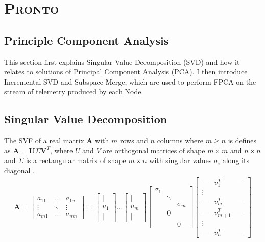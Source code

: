 \section{\protect\textsc{Pronto}}

\subsection{Principle Component Analysis}
This section first explains Singular Value Decomposition (SVD) and how it
relates to solutions of Principal Component Analysis (PCA). I then introduce
Incremental-SVD and Subspace-Merge, which are used to perform FPCA on the stream
of telemetry produced by each Node.

\subsection{Singular Value Decomposition}
The SVF of a real matrix $\mathbf{A}$ with $m$ rows and $n$ columns where $m
\geq n$ is defines as $\mathbf{A} = \mathbf{U}\Sigma\mathbf{V}^T$, where $U$ and
$V$ are orthogonal matrices of shape $m \times m$ and $n \times n$ and $\Sigma$
is a rectangular matrix of shape $m \times n$ with singular values $\sigma_i$
along its diagonal \cite{}.
\begin{align}
\mathbf{A} = \begin{bmatrix} a_{11} & \dots & a_{1n} \\ \vdots & \ddots & \vdots
    \\ a_{m1} & \dots & a_{mn} \end{bmatrix} = \begin{bmatrix} \mid \\ u_1 \\
        \mid \end{bmatrix} \dots \begin{bmatrix} \mid \\ u_m \\ \mid
            \end{bmatrix} \begin{bmatrix} \sigma_1 & & \\ & \ddots & \\ & &
                \sigma_m \\ & 0 & \\ & & \\ & & 0 \end{bmatrix} \begin{bmatrix}
\text{---} & v_1^T & \text{---} \\ \vdots \\ \text{---} & v_m^T & \text{---} \\
\text{---} & v_{m+1}^T & \text{---} \\ \vdots \\ \text{---} & v_n^T & \text{---}
\end{bmatrix}
\end{align}

